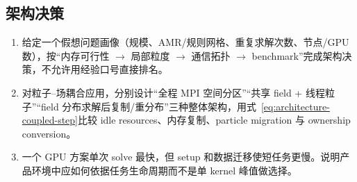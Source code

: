 \subsection*{架构决策}
\begin{enumerate}[label=\arabic*.]
\item 给定一个假想问题画像（规模、AMR/规则网格、重复求解次数、节点/GPU 数），按“内存可行性 $\rightarrow$ 局部粒度 $\rightarrow$ 通信拓扑 $\rightarrow$ benchmark”完成架构决策，不允许用经验口号直接排名。
\item 对粒子--场耦合应用，分别设计“全程 MPI 空间分区”“共享 field + 线程粒子”“field 分布求解后复制/重分布”三种整体架构，用式~\eqref{eq:architecture-coupled-step}比较 idle resources、内存复制、particle migration 与 ownership conversion。
\item 一个 GPU 方案单次 solve 最快，但 setup 和数据迁移使短任务更慢。说明产品环境中应如何依据任务生命周期而不是单 kernel 峰值做选择。
\end{enumerate}
